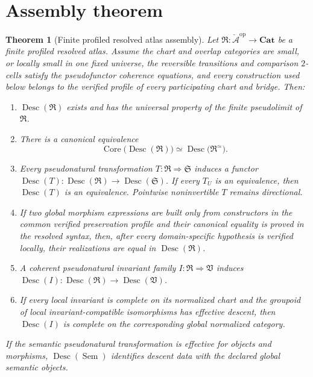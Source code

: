 \documentclass[11pt]{article}
\newtheorem{theorem}[definition]{Theorem}
\newcommand{\Desc}{\operatorname{Desc}}
\newcommand{\Core}{\operatorname{Core}}
\newcommand{\Cat}{\mathbf{Cat}}
\begin{document}
\section{Assembly theorem}

\begin{theorem}[Finite profiled resolved atlas assembly]
Let $\mathfrak R:\check{\mathcal A}^{\mathrm{op}}\to\Cat$ be a finite profiled resolved atlas.  Assume the chart and overlap categories are small, or locally small in one fixed universe, the reversible transitions and comparison $2$-cells satisfy the pseudofunctor coherence equations, and every construction used below belongs to the verified profile of every participating chart and bridge.  Then:
\begin{enumerate}[label=\textup{(\roman*)}]
\item $\Desc(\mathfrak R)$ exists and has the universal property of the finite pseudolimit of $\mathfrak R$.
\item There is a canonical equivalence
\[
\Core\bigl(\Desc(\mathfrak R)\bigr)
\simeq
\Desc\bigl(\mathfrak R^{\simeq}\bigr).
\]
\item Every pseudonatural transformation $T:\mathfrak R\Rightarrow\mathfrak S$ induces a functor $\Desc(T):\Desc(\mathfrak R)\to\Desc(\mathfrak S)$.  If every $T_U$ is an equivalence, then $\Desc(T)$ is an equivalence.  Pointwise noninvertible $T$ remains directional.
\item If two global morphism expressions are built only from constructors in the common verified preservation profile and their canonical equality is proved in the resolved syntax, then, after every domain-specific hypothesis is verified locally, their realizations are equal in $\Desc(\mathfrak R)$.
\item A coherent pseudonatural invariant family $I:\mathfrak R\Rightarrow\mathfrak V$ induces $\Desc(I):\Desc(\mathfrak R)\to\Desc(\mathfrak V)$.
\item If every local invariant is complete on its normalized chart and the groupoid of local invariant-compatible isomorphisms has effective descent, then $\Desc(I)$ is complete on the corresponding global normalized category.
\end{enumerate}
If the semantic pseudonatural transformation is effective for objects and morphisms, $\Desc(\operatorname{Sem})$ identifies descent data with the declared global semantic objects.
\end{theorem}
\end{document}

